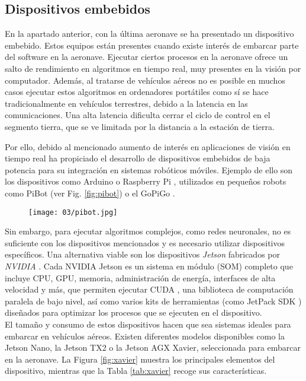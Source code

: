 \documentclass[../main.tex]{subfiles}
\begin{document}
\subsection{Dispositivos embebidos} \label{section:met-embeb}
En la apartado anterior, con la última aeronave se ha presentado un dispositivo embebido. Estos equipos están presentes cuando existe interés de embarcar parte del software en la aeronave. Ejecutar ciertos procesos en la aeronave ofrece un salto de rendimiento en algoritmos en tiempo real, muy presentes en la visión por computador. Además, al tratarse de vehículos aéreos no es posible en muchos casos ejecutar estos algoritmos en ordenadores portátiles como sí se hace tradicionalmente en vehículos terrestres, debido a la latencia en las comunicaciones. Una alta latencia dificulta cerrar el ciclo de control en el segmento tierra, que se ve limitada por la distancia a la estación de tierra.

Por ello, debido al mencionado aumento de interés en aplicaciones de visión en tiempo real ha propiciado el desarrollo de dispositivos embebidos de baja potencia para su integración en sistemas robóticos móviles. Ejemplo de ello son los dispositivos como Arduino \cite{arduino} o Raspberry Pi \cite{raspberry}, utilizados en pequeños robots como PiBot \cite{vega2018pibot} (ver Fig. \ref{fig:pibot}) o el GoPiGo \cite{gopigo}.

\begin{figure}[!ht]
 	{\texttt{[image: 03/pibot.jpg]}}
\end{figure}

Sin embargo, para ejecutar algoritmos complejos, como redes neuronales, no es suficiente con los dispositivos mencionados y es necesario utilizar dispositivos específicos. Una alternativa viable son los dispositivos \emph{Jetson} fabricados por \emph{NVIDIA} \cite{jetson}. Cada NVIDIA Jetson es un sistema en módulo (SOM) completo que incluye CPU, GPU, memoria, administración de energía, interfaces de alta velocidad y más, que permiten ejecutar CUDA \cite{cuda}, una biblioteca de computación paralela de bajo nivel, así como varios kits de herramientas (como JetPack SDK \cite{jetpack}) diseñados para optimizar los procesos que se ejecuten en el dispositivo. \\
El tamaño y consumo de estos dispositivos hacen que sea sistemas ideales para embarcar en vehículos aéreos. Existen diferentes modelos disponibles como la Jetson Nano, la Jetson TX2 o la Jetson AGX Xavier, seleccionada para embarcar en la aeronave. La Figura \ref{fig:xavier} muestra los principales elementos del dispositivo, mientras que la Tabla \ref{tab:xavier} recoge sus características.
\end{document}
